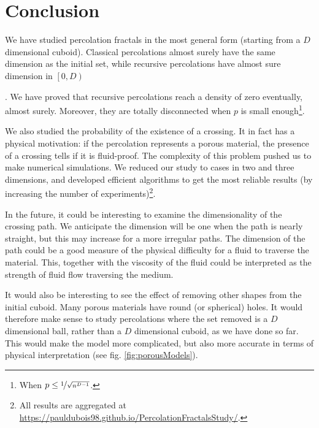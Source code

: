 \section{Conclusion}
We have studied percolation fractals in the most general form (starting from a $D$ dimensional cuboid).
Classical percolations almost surely have the same dimension as the initial set\footnotemark, while recursive percolations have almost sure dimension in $\left[ 0, D \right)$
\addtocounter{footnote}{-1}
\footnotemark
{}.
We have proved that recursive percolations reach a density of zero eventually, almost surely.
Moreover, they are totally disconnected when $p$ is small enough\footnote{When $p \leq \nicefrac{1}{\sqrt{n^{D-1}}}$.}.

We also studied the probability of the existence of a crossing.
It in fact has a physical motivation: if the percolation represents a porous material, the presence of a crossing tells if it is fluid-proof.
The complexity of this problem pushed us to make numerical simulations.
We reduced our study to cases in two and three dimensions, and developed efficient algorithms to get the most reliable results (by increasing the number of experiments)\footnote{All results are aggregated at \url{https://pauldubois98.github.io/PercolationFractalsStudy/}.}.

In the future, it could be interesting to examine the dimensionality of the crossing path.
We anticipate the dimension will be one when the path is nearly straight, but this may increase for a more irregular paths.
The dimension of the path could be a good measure of the physical difficulty for a fluid to traverse the material.
This, together with the viscosity of the fluid could be interpreted as the strength of fluid flow traversing the medium.

It would also be interesting to see the effect of removing other shapes from the initial cuboid.
Many porous materials have round (or spherical) holes.
It would therefore make sense to study percolations where the set removed is a $D$ dimensional ball, rather than a $D$ dimensional cuboid, as we have done so far.
This would make the model more complicated, but also more accurate in terms of physical interpretation (see fig. \ref{fig:porousModels}).

